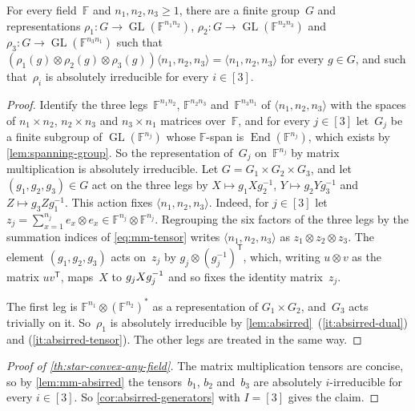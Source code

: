 \documentclass[11pt,letterpaper]{article}
\newcommand{\FF}{\mathbb{F}}
\DeclareMathOperator{\GL}{GL}
\DeclareMathOperator{\End}{End}
\begin{document}
\begin{lemma}\label{lem:mm-absirred}
For every field~$\FF$ and $n_1,n_2,n_3 \geq1$, there are a finite group~$G$ and representations $\rho_1 : G \to \GL(\FF^{n_1 n_2})$, $\rho_2 : G \to \GL(\FF^{n_2 n_3})$ and $\rho_3 : G \to \GL(\FF^{n_3 n_1})$ such that $(\rho_1(g) \otimes \rho_2(g) \otimes \rho_3(g)) \langle n_1,n_2,n_3 \rangle = \langle n_1,n_2,n_3 \rangle$ for every $g \in G$, and such that~$\rho_i$ is absolutely irreducible for every $i \in [3]$.
\end{lemma}
\begin{proof}
Identify the three legs~$\FF^{n_1 n_2}$, $\FF^{n_2 n_3}$ and~$\FF^{n_3 n_1}$ of $\langle n_1, n_2, n_3 \rangle$ with the spaces of $n_1 \times n_2$, $n_2 \times n_3$ and $n_3 \times n_1$ matrices over~$\FF$, and for every $j \in [3]$ let~$G_j$ be a finite subgroup of $\GL(\FF^{n_j})$ whose $\FF$-span is $\End(\FF^{n_j})$, which exists by \cref{lem:spanning-group}. So the representation of~$G_j$ on~$\FF^{n_j}$ by matrix multiplication is absolutely irreducible. Let $G = G_1 \times G_2 \times G_3$, and let $(g_1, g_2, g_3) \in G$ act on the three legs by $X \mapsto g_1 X g_2^{-1}$, $Y \mapsto g_2 Y g_3^{-1}$ and $Z \mapsto g_3 Z g_1^{-1}$. This action fixes $\langle n_1,n_2,n_3\rangle$. Indeed, for $j \in [3]$ let $z_j = \sum_{x=1}^{n_j} e_x \otimes e_x \in \FF^{n_j} \otimes \FF^{n_j}$. Regrouping the six factors of the three legs by the summation indices of \eqref{eq:mm-tensor} writes $\langle n_1,n_2,n_3\rangle$ as $z_1 \otimes z_2 \otimes z_3$. The element $(g_1, g_2, g_3)$ acts on~$z_j$ by $g_j \otimes (g_j^{-1})^{\mathsf{T}}$, which, writing $u \otimes v$ as the matrix $uv^{\mathsf{T}}$, maps~$X$ to $g_j X g_j^{\smash[t]{-1}}$ and so fixes the identity matrix~$z_j$.

The first leg is $\FF^{n_1} \otimes (\FF^{n_2})^*$ as a representation of $G_1 \times G_2$, and~$G_3$ acts trivially on it. So~$\rho_1$ is absolutely irreducible by \cref{lem:absirred}~(\ref{it:absirred-dual}) and (\ref{it:absirred-tensor}). The other legs are treated in the same way.
\end{proof}

\begin{proof}[Proof of \cref{th:star-convex-any-field}]
The matrix multiplication tensors are concise, so by \cref{lem:mm-absirred} the tensors~$b_1$, $b_2$ and~$b_3$ are absolutely $i$-irreducible for every $i \in [3]$. So \cref{cor:absirred-generators} with $I = [3]$ gives the claim.
\end{proof}
\end{document}

